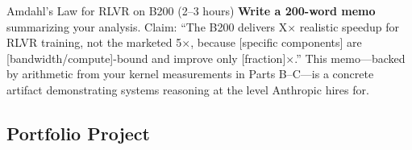\begin{exercise}{Amdahl's Law for RLVR on B200 (2--3 hours)}
\textbf{Write a 200-word memo} summarizing your analysis. Claim: ``The B200 delivers X$\times$ realistic speedup for RLVR training, not the marketed 5$\times$, because [specific components] are [bandwidth/compute]-bound and improve only [fraction]$\times$.'' This memo---backed by arithmetic from your kernel measurements in Parts B--C---is a concrete artifact demonstrating systems reasoning at the level Anthropic hires for.
\end{exercise}

\subsection{Portfolio Project}

